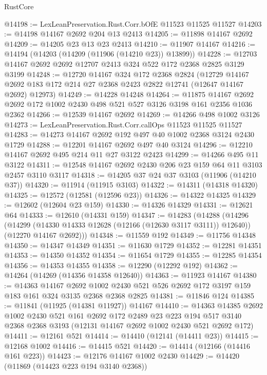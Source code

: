 \begin{lexlean}{RustCore}
\begin{coremodule}
@14198 := LexLeanPreservation.Rust.Corr.bOfE @11523 @11525 @11527
@14203 := @14198 @14167 @2692 @204 @13 @2413
@14205 := @11898 @14167 @2692
@14209 := @14205 @23 @13 @23 @2413
@14210 := @11907 @14167
@14216 := @14194 (@14203 (@14209 (@11906 (@14210 @23)) @13899))
@14228 := @12703 @14167 @2692 @2692 @12707 @2413 @324 @522 @172 @2368 @2825 @3129 @3199
@14248 := @12720
    @14167
    @324
    @172
    @2368
    @2824
    (@12729 @14167 @2692 @183 @172 @214 @27 @2368 @2423 @2822 @12741 (@12647 @14167 @2692) @12973)
@14249 := @14228 @14248
@14264 := @11875
    @14167
    @2692
    @2692
    @172
    @1002
    @2430
    @498
    @521
    @527
    @3126
    @3198
    @161
    @2356
    @1036
    @2362
@14266 := @12539 @14167 @2692
@14269 := @14266 @498 @1002 @3126
@14273 := LexLeanPreservation.Rust.Corr.callOps @11523 @11525 @11527
@14283 := @14273 @14167 @2692 @192 @497 @40 @1002 @2368 @3124 @2430 @1729
@14288 := @12201 @14167 @2692 @497 @40 @3124
@14296 := @12210 @14167 @2692 @495 @214 @11 @27 @3122 @2423
@14299 := @14266 @495 @11 @3122
@14311 := @12548 @14167 @2692 @2430 @206 @23 @159 @64 @11 @3103 @2457 @3110 @3117
@14318 := @14205 @37 @24 @37 @3103 (@11906 (@14210 @37))
@14320 := @11914 (@11915 @3103)
@14322 := @14311 (@14318 @14320)
@14325 := @12572 (@12581 (@12596 @23))
@14326 := @14322 @14325
@14329 := @12602 (@12604 @23 @159)
@14330 := @14326 @14329
@14331 := @12621 @64
@14333 := @12610 (@14331 @159)
@14347 := @14283
    (@14288
      (@14296
        (@14299 (@14330 @14333 @12628 (@12166 (@12630 @3117 @3111)) @12640))
        (@12270 @14167 @2692)))
@14348 := @11559 @192
@14349 := @11756 @14348
@14350 := @14347 @14349
@14351 := @11630 @1729
@14352 := @12281 @14351
@14353 := @14350 @14352
@14354 := @11654 @1729
@14355 := @12285 @14354
@14356 := @14353 @14355
@14358 := @12290 (@12292 @192)
@14362 := @14264 (@14269 (@14356 @14358 @12640))
@14363 := @11923 @14167
@14380 := @14363
    @14167
    @2692
    @1002
    @2430
    @521
    @526
    @2692
    @172
    @3197
    @159
    @183
    @161
    @324
    @3135
    @2368
    @2368
    @2825
@14381 := @11846 @124
@14385 := @11841 (@11925 (@14381 @11927)) @14167
@14410 := @14363
    @14385
    @2692
    @1002
    @2430
    @521
    @161
    @2692
    @172
    @2489
    @23
    @223
    @194
    @517
    @3140
    @2368
    @2368
    @3193
    (@12131 @14167 @2692 @1002 @2430 @521 @2692 @172)
@14411 := @12161 @521
@14414 := @14410 (@12141 (@14411 @23))
@14415 := @12168 @1002
@14416 := @14415 @521
@14420 := @14414 (@12166 (@14416 @161 @223))
@14423 := @12176 @14167 @1002 @2430
@14429 := @14420 (@11869 (@14423 @223 @194 @3140 @2368))

\end{coremodule}
\end{lexlean}
